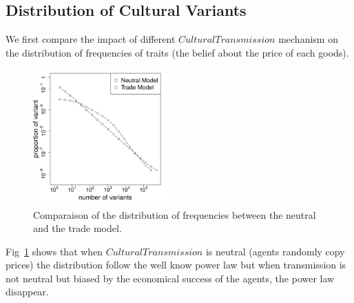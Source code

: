 \documentclass[a0paper,landscape,showframe]{baposter}
\begin{document}
\begin{poster}
{\begin{multicols}{2}
\subsection*{Distribution of Cultural Variants}
We first compare the impact of different $CulturalTransmission$ mechanism on the distribution of frequencies of traits (the belief about the price of each goods). 
\begin{figure}[H]
	\centering
	\setlength{\columnseprule}{0pt}
	\begin{multicols}{2}
		\includegraphics[width=5.2cm]{img/2SetupDistribA.pdf} 
		\caption{Comparaison of the distribution of frequencies between the neutral and the trade model.}
		\label{fig:2setDi}
	\end{multicols}
\end{figure}
\vspace{-.8cm}
Fig~\ref{fig:2setDi} shows that when $CulturalTransmission$ is neutral (agents randomly copy prices) the distribution follow the well know power law \cite{bentley_random_2004} but when transmission is not neutral but biased by the economical success of the agents, the power law disappear.

\end{multicols}}
\end{poster}
\end{document}

